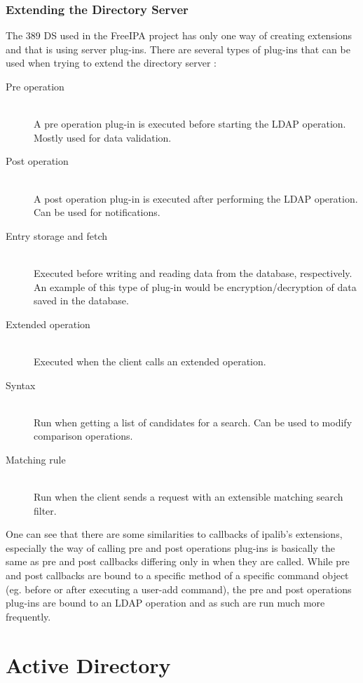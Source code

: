 \subsection{Extending the Directory Server}
The 389 DS used in the FreeIPA project has only one way of creating extensions and that is using server plug-ins.
There are several types of plug-ins that can be used when trying to extend the directory server \cite{extLDAP}:
\begin{description}
    \item[Pre operation]\hfill \\A pre operation plug-in is executed before starting the LDAP operation. Mostly used for data validation.
    \item[Post operation]\hfill \\A post operation plug-in is executed after performing the LDAP operation. Can be used for notifications.
    \item[Entry storage and fetch]\hfill \\Executed before writing and reading data from the database, respectively. An example of this type of plug-in would be encryption/decryption of data saved in the database.
    \item[Extended operation]\hfill \\Executed when the client calls an extended operation.
    \item[Syntax]\hfill \\Run when getting a list of candidates for a search. Can be used to modify comparison operations.
    \item[Matching rule]\hfill \\Run when the client sends a request with an extensible matching search filter.
\end{description}
One can see that there are some similarities to callbacks of ipalib's extensions, especially the way of calling pre and post operations plug-ins is basically the same as pre and post callbacks
differing only in when they are called. While pre and post callbacks are bound to a specific method of a specific command object (eg. before or after executing a user-add command),
the pre and post operations plug-ins are bound to an LDAP operation and as such are run much more frequently.

\chapter{Active Directory}
\label{chp:ad}

